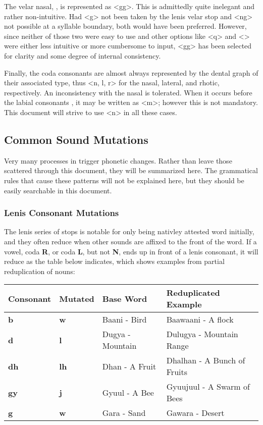   The velar nasal, \phonemic{\engma}, is represented as <gg>. This is admittedly quite inelegant and rather non-intuitive. Had <g> not been taken by the lenis velar stop and <ng> not possible at a syllable boundary, both would have been preferred. However, since neither of those two were easy to use and other options like <q> and <> were either less intuitive or more cumbersome to input, <gg> has been selected for clarity and some degree of internal consistency.\par
  Finally, the coda consonants are almost always represented by the dental graph of their associated type, thus <n, l, r> for the nasal, lateral, and rhotic, respectively. An inconsistency with the nasal is tolerated. When it occurs before the labial consonants , it may be written as <m>; however this is not mandatory. This document will strive to use <n> in all these cases.\par

  \subsection{Common Sound Mutations}
  Very many processes in \langname trigger phonetic changes. Rather than leave those scattered through this document, they will be summarized here. The grammatical rules that cause these patterns will not be explained here, but they should be easily searchable in this document.

  \subsubsection{Lenis Consonant Mutations}
  The lenis series of stops is notable for only being nativley attested word initially, and they often reduce when other sounds are affixed to the front of the word. If a vowel, coda \textbf{R}, or coda \textbf{L}, but not \textbf{N}, ends up in front of a lenis consonant, it will reduce as the table below indicates, which shows examples from partial reduplication of nouns:

  \vertspace
  \begin{tabular}{|l|l|l|l|}
    \hline
    Consonant   & Mutated     & Base Word        & Reduplicated Example         \\ \hline \hline
    \textbf{b}  & \textbf{w}  & Baani - Bird     & Baawaani - A flock           \\
    \textbf{d}  & \textbf{l}  & Dugya - Mountain & Dulugya  - Mountain Range    \\
    \textbf{dh} & \textbf{lh} & Dhan  - A Fruit  & Dhalhan   - A Bunch of Fruits \\
    \textbf{gy} & \textbf{j}  & Gyuul - A Bee    & Gyuujuul - A Swarm of Bees   \\
    \textbf{g}  & \textbf{w}  & Gara  - Sand     & Gawara   - Desert            \\ \hline
  \end{tabular}

